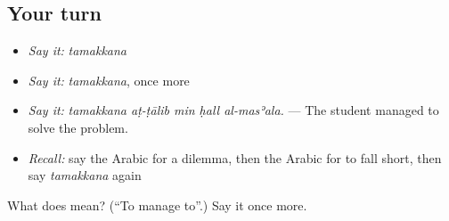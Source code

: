 \subsection*{Your turn}
\begin{itemize}
\raggedright
  \item \emph{Say it:} \emph{tamakkana}
  \item \emph{Say it:} \emph{tamakkana}, once more
  \item \emph{Say it:} \emph{tamakkana aṭ-ṭālib min ḥall al-masʾala.} — The student managed to solve the problem.
  \item \emph{Recall:} say the Arabic for a dilemma, then the Arabic for to fall short, then say \emph{tamakkana} again
\end{itemize}

\begin{tcolorbox}[breakable,colback=teal!4,colframe=teal!35!black,title={Before you move on}]
What does  mean? (\textquotedblleft{}To manage to\textquotedblright{}.) Say it once more.
\end{tcolorbox}
